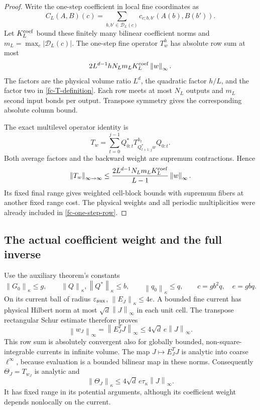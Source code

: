 \documentclass[11pt]{article}
\theoremstyle{remark}
\newcommand{\norm}[1]{\left\|#1\right\|}
\begin{document}
\begin{proof}
Write the one-step coefficient in local fine coordinates as
\[
 C_L(A,B)(c)=\sum_{b,b'\in\mathcal D_L(c)}
                    c_{c;b,b'}(A(b),B(b')).
\]
Let $K_L^{\rm coef}$ bound these finitely many bilinear coefficient
norms and $m_L=\max_c|\mathcal D_L(c)|$. The one-step fine
operator $T_w^h$ has absolute row sum at most
\begin{equation}
 2L^{d-1}hN_Lm_LK_L^{\rm coef}\norm{w}_\infty.
 \label{fc-one-step-row}
\end{equation}
The factors are the physical volume ratio $L^d$, the quadratic
factor $h/L$, and the factor two in
\eqref{fc-T-definition}. Each row meets at most $N_L$ outputs and
$m_L$ second input bonds per output. Transpose symmetry gives the
corresponding absolute column bound.

The exact multilevel operator identity is
\begin{equation}
 T_w=\sum_{t=0}^{j-1}Q_{0:t}^*
           T^{h_t}_{Q_{t+1:j}^*w}Q_{0:t}.
 \label{fc-T-operator-chain}
\end{equation}
Both average factors and the backward weight are supremum
contractions. Hence
\begin{equation}
 \norm{T_w}_{\infty\to\infty}
 \le \frac{2L^{d-1}N_Lm_LK_L^{\rm coef}}{L-1}
                         \norm{w}_\infty.
 \label{fc-T-supremum-bound}
\end{equation}
Its fixed final range gives weighted cell-block bounds with
supremum fibers at another fixed range cost. The physical weights
and all periodic multiplicities were already included in
\eqref{fc-one-step-row}.
\end{proof}

\subsection{The actual coefficient weight and the full inverse}
\label{fc-full-neighborhood-section}

Use the auxiliary theorem's constants
\[
 \norm{G_0}_\kappa\le g,\qquad
 \norm{Q}_\kappa,\norm{Q^*}_\kappa\le b,\qquad
 \norm{q_0}_\kappa\le q,
 \qquad c=gb^2q,\quad e=gbq.
\]
On its current ball of radius $\varepsilon_{\rm aux}$,
$\norm{E_J}_\kappa\le4e$. A bounded fine current has physical
Hilbert norm at most $\sqrt d\norm{J}_\infty$ in each unit cell.
The transpose rectangular Schur estimate therefore proves
\begin{equation}
 \norm{w_J}_\infty=\norm{E_J^TJ}_\infty
       \le4\sqrt d\,e\norm{J}_\infty.
 \label{fc-weight-bound}
\end{equation}
This row sum is absolutely convergent also for globally bounded,
non-square-integrable currents in infinite volume.
The map $J\mapsto E_J^TJ$ is analytic into coarse
$\ell^\infty$, because evaluation is a bounded bilinear map in
these norms. Consequently $\Theta_J=T_{w_J}$ is analytic and
\begin{equation}
 \norm{\Theta_J}_\kappa
       \le4\sqrt d\,e\tau_\kappa\norm{J}_\infty.
 \label{fc-Theta-bound}
\end{equation}
It has fixed range in its potential arguments, although its
coefficient weight depends nonlocally on the current.
\end{document}
